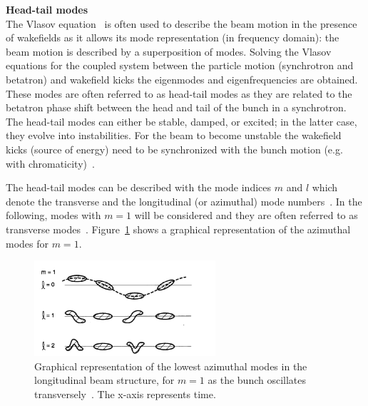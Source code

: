 
\textbf{Head-tail modes}\\
The Vlasov equation~\cite{Vlasov:426186} is often used to describe the beam motion in the presence of wakefields as it allows its mode representation (in frequency domain): the beam motion is described by a superposition of modes. %
Solving the Vlasov equations for the coupled system between the particle motion (synchrotron and betatron) and wakefield kicks the eigenmodes and eigenfrequencies are obtained. These modes are often referred to as head-tail modes as they are related to the betatron phase shift between the head and tail of the bunch in a synchrotron. The head-tail modes can either be stable, damped, or excited; in the latter case, they evolve into instabilities. For the beam to become unstable the wakefield kicks (source of energy) need to be synchronized with the bunch motion (e.g. with chromaticity)~\cite{instabilities_rumulo_li}.

The head-tail modes can be described with the mode indices $m$ and $l$ which denote the transverse and the longitudinal (or azimuthal) mode numbers~\cite{Chao:collective}. In the following, modes with $m=1$ will be considered and they are often referred to as transverse modes~\cite{Chao:collective}. Figure~\ref{fig:azimuthal_mode} shows a graphical representation of the azimuthal modes for $m=1$.

\begin{figure}[!h] %
    \centering         
    \includegraphics[width=0.6\textwidth]{images/Ch2/transverse_mode_l.png}
        \caption{Graphical representation of the lowest azimuthal modes in the longitudinal beam structure, for $m=1$ as the bunch oscillates transversely~\cite{Chao:collective}. The x-axis represents time.} 
        \label{fig:azimuthal_mode}
 \end{figure}
 
